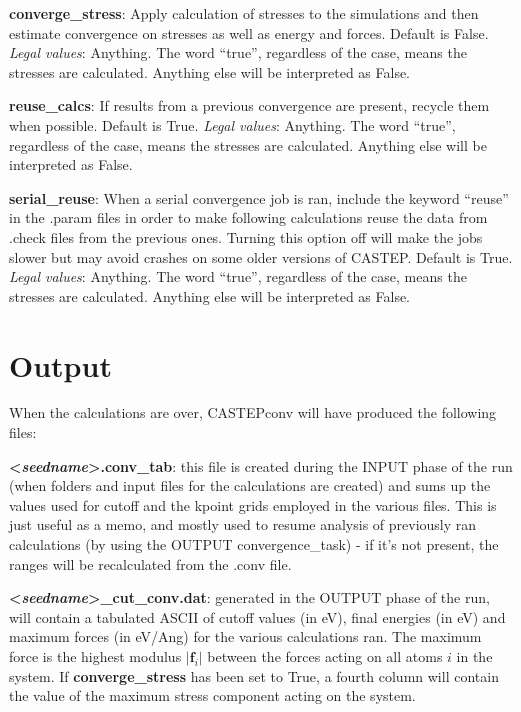 \documentclass[10pt]{article}
\begin{document}
\textbf{converge\_stress}: Apply calculation of stresses to the simulations and then estimate convergence on stresses as well as energy and forces. Default is False.\newline
\textit{Legal values}: Anything. The word ``true'', regardless of the case, means the stresses are calculated. Anything else will be interpreted as False.\newline

\textbf{reuse\_calcs}: If results from a previous convergence are present, recycle them when possible. Default is True.\newline
\textit{Legal values}: Anything. The word ``true'', regardless of the case, means the stresses are calculated. Anything else will be interpreted as False.\newline

\textbf{serial\_reuse}: When a serial convergence job is ran, include the keyword ``reuse'' in the .param files in order to make following calculations reuse the data from .check files from the previous ones. Turning this option off will make the jobs slower but may avoid crashes on some older versions of CASTEP. Default is True.\newline
\textit{Legal values}: Anything. The word ``true'', regardless of the case, means the stresses are calculated. Anything else will be interpreted as False.\newline

\section{Output}

When the calculations are over, CASTEPconv will have produced the following files:

\textbf{\textless \textit{seedname}\textgreater.conv\_tab}: this file is created during the INPUT phase of the run (when folders and input files for the calculations are created) and sums up the values used for cutoff and the kpoint grids employed in the various files. This is just useful as a memo, and mostly used to resume analysis of previously ran calculations (by using the OUTPUT convergence\_task) - if it's not present, the ranges will be recalculated from the .conv file.

\textbf{\textless \textit{seedname}\textgreater\_cut\_conv.dat}: generated in the OUTPUT phase of the run, will contain a tabulated ASCII of cutoff values (in eV), final energies (in eV) and maximum forces (in eV/Ang) for the various calculations ran. The maximum force is the highest modulus $|\mathbf{f}_i|$ between the forces acting on all atoms $i$ in the system. If \textbf{converge\_stress} has been set to True, a fourth column will contain the value of the maximum stress component acting on the system.
\end{document}
